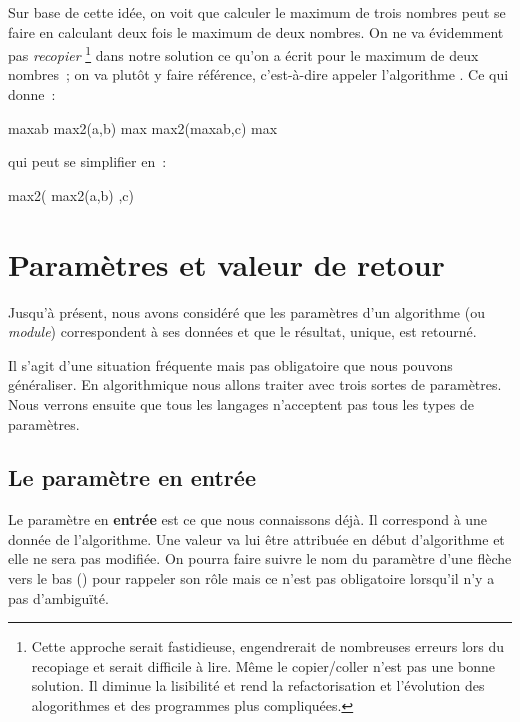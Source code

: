 	Sur base de cette idée, 
	on voit que calculer le maximum de trois nombres
	peut se faire en calculant deux fois le maximum de deux nombres.
	On ne va évidemment pas \emph{recopier}%
	\footnote{
		Cette approche serait fastidieuse,
		engendrerait de nombreuses erreurs lors du recopiage
		et serait difficile à lire. Même le copier/coller n'est pas une bonne 
		solution. Il diminue la lisibilité et rend la refactorisation et 
		l'évolution des alogorithmes et des programmes plus compliquées.
	} dans notre solution
	ce qu’on a écrit pour le maximum de deux nombres~;
	on va plutôt y faire référence, 
	c’est-à-dire appeler l’algorithme . 
	Ce qui donne~:

	\begin{pseudocode}
		\Let maxab \Gets max2(a,b)
		\Let max \Gets max2(maxab,c)
		\Return max
	\EndAlgo
	\end{pseudocode}

	qui peut se simplifier en~:
	
	\begin{pseudocode}
	\Algo{max3}{\Par{a,b,c}{reals}}{real}
		\Return max2( max2(a,b) ,c)
	\EndAlgo
	\end{pseudocode}

\section{Paramètres et valeur de retour}
\label{paramètres}

	Jusqu’à présent, nous avons considéré que les paramètres d’un algorithme (ou
	\emph{module}) correspondent à ses données et que le résultat,
	unique, est retourné.

	Il s’agit d’une situation fréquente mais pas obligatoire que nous pouvons
	généraliser.  En algorithmique nous allons traiter avec trois sortes de 
	paramètres. Nous verrons ensuite que tous les langages n'acceptent pas tous 
	les types de paramètres. 

	\subsection{Le paramètre en entrée}
	\label{param.entrée}

		Le paramètre en \textbf{entrée} est ce que nous connaissons déjà.  Il
		correspond à une donnée de l’algorithme.  Une valeur va lui être
		attribuée en début d’algorithme et elle ne sera pas modifiée.  On pourra
		faire suivre le nom du paramètre d’une flèche vers le bas (\In) pour
		rappeler son rôle mais ce n'est pas obligatoire lorsqu'il n'y a pas
		d'ambiguïté.
		
